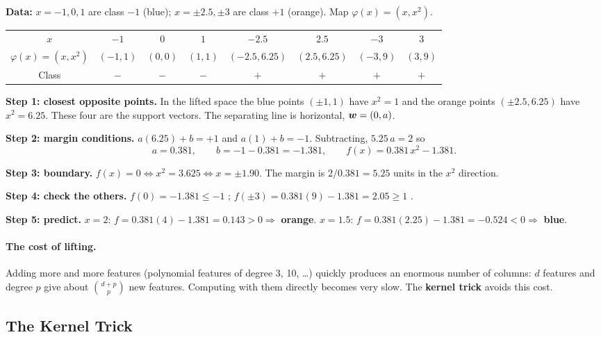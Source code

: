 \begin{example}
\textbf{Data:} $x=-1,0,1$ are class $-1$ (blue); $x=\pm2.5,\pm3$ are class $+1$ (orange). Map $\varphi(x)=(x,x^2)$.

\begin{center}
\begin{tabular}{@{}c|ccc|cccc@{}}
\toprule
$x$ & $-1$ & $0$ & $1$ & $-2.5$ & $2.5$ & $-3$ & $3$\\
$\varphi(x)=(x,x^2)$ & $(-1,1)$ & $(0,0)$ & $(1,1)$ & $(-2.5,6.25)$ & $(2.5,6.25)$ & $(-3,9)$ & $(3,9)$\\
Class & $-$ & $-$ & $-$ & $+$ & $+$ & $+$ & $+$\\
\bottomrule
\end{tabular}
\end{center}

\textbf{Step 1: closest opposite points.} In the lifted space the blue points $(\pm1,1)$ have $x^2=1$ and the orange points $(\pm2.5,6.25)$ have $x^2=6.25$. These four are the support vectors. The separating line is horizontal, $\boldsymbol{w}=(0,a)$.

\medskip
\textbf{Step 2: margin conditions.} $a(6.25)+b=+1$ and $a(1)+b=-1$. Subtracting, $5.25\,a=2$ so
\[
  a=0.381,\qquad b=-1-0.381=-1.381,\qquad f(x)=0.381\,x^2-1.381 .
\]

\textbf{Step 3: boundary.} $f(x)=0\iff x^2=3.625\iff x=\pm1.90$. The margin is $2/0.381=5.25$ units in the $x^2$ direction.

\medskip
\textbf{Step 4: check the others.} $f(0)=-1.381\le-1$ \checkmark; $f(\pm3)=0.381(9)-1.381=2.05\ge1$ \checkmark.

\medskip
\textbf{Step 5: predict.} $x=2$: $f=0.381(4)-1.381=0.143>0\Rightarrow$ \textbf{orange}. $x=1.5$: $f=0.381(2.25)-1.381=-0.524<0\Rightarrow$ \textbf{blue}.
\end{example}

\paragraph{The cost of lifting.} Adding more and more features (polynomial features of degree 3, 10, \dots) quickly produces an enormous number of columns: $d$ features and degree $p$ give about $\binom{d+p}{p}$ new features. Computing with them directly becomes very slow. The \textbf{kernel trick} avoids this cost.

\subsection{The Kernel Trick}

